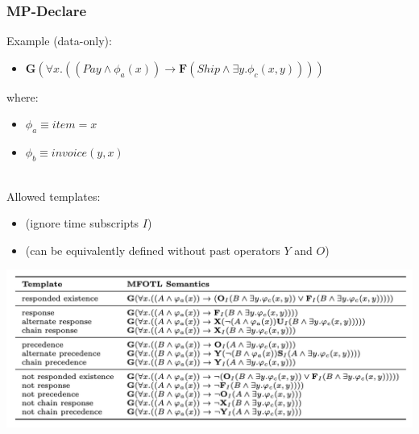 \documentclass{beamer}
\newcommand{\always}{\mathbf{G}\xspace}
\newcommand{\eventually}{\mathbf{F}\xspace}
\begin{document}
\begin{frame}
\frametitle{MP-Declare}
Example (data-only):

\begin{itemize}
	\item $\always(\forall x.((Pay\land\phi_a(x)) \rightarrow \eventually (Ship \land\exists y.\phi_c(x, y))))$
\end{itemize}

where:
\begin{itemize}
	\item $\phi_a\equiv item=x$ 
	\item $\phi_b\equiv invoice(y,x)$ 
\end{itemize}

~\\

Allowed templates:
\begin{scriptsize}
\begin{itemize}
	\item (ignore time subscripts $I$)
	\item (can be equivalently defined without past operators $Y$ and $O$)
\end{itemize}
\end{scriptsize}

\begin{center}
\includegraphics[scale=.3]{figures/mp-declare}
\end{center}



\end{frame}

\end{document}
